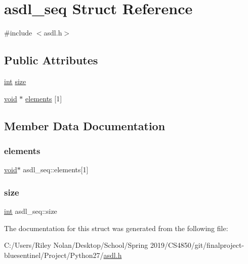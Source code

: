 \hypertarget{structasdl__seq}{}\section{asdl\+\_\+seq Struct Reference}
\label{structasdl__seq}


{\ttfamily \#include $<$asdl.\+h$>$}

\subsection*{Public Attributes}
\begin{DoxyCompactItemize}
\item 
\mbox{\hyperlink{warnings_8h_a74f207b5aa4ba51c3a2ad59b219a423b}{int}} \mbox{\hyperlink{structasdl__seq_a0501c0bedd5291246231fff3237b74d6}{size}}
\item 
\mbox{\hyperlink{_s_d_l__opengles2__gl2ext_8h_ae5d8fa23ad07c48bb609509eae494c95}{void}} $\ast$ \mbox{\hyperlink{structasdl__seq_a44dec4611ce8805355073ab64acf4c9c}{elements}} \mbox{[}1\mbox{]}
\end{DoxyCompactItemize}


\subsection{Member Data Documentation}
\mbox{\label{structasdl__seq_a44dec4611ce8805355073ab64acf4c9c}} 
\subsubsection{\texorpdfstring{elements}{elements}}
{\footnotesize\ttfamily \mbox{\hyperlink{_s_d_l__opengles2__gl2ext_8h_ae5d8fa23ad07c48bb609509eae494c95}{void}}$\ast$ asdl\+\_\+seq\+::elements\mbox{[}1\mbox{]}}

\mbox{\label{structasdl__seq_a0501c0bedd5291246231fff3237b74d6}} 
\subsubsection{\texorpdfstring{size}{size}}
{\footnotesize\ttfamily \mbox{\hyperlink{warnings_8h_a74f207b5aa4ba51c3a2ad59b219a423b}{int}} asdl\+\_\+seq\+::size}



The documentation for this struct was generated from the following file\+:\begin{DoxyCompactItemize}
\item 
C\+:/\+Users/\+Riley Nolan/\+Desktop/\+School/\+Spring 2019/\+C\+S4850/git/finalproject-\/bluesentinel/\+Project/\+Python27/\mbox{\hyperlink{asdl_8h}{asdl.\+h}}\end{DoxyCompactItemize}
